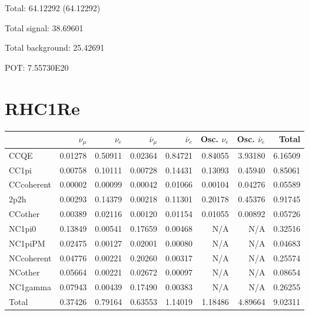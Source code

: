 \documentclass[10pt,a4paper]{article}
\begin{document}
Total: 64.12292    (64.12292)


Total signal: 38.69601


Total background: 25.42691

POT: 7.55730E20


\section*{RHC1Re}
\begin{tabular} { | l ||r | r | r | r | r | r | | r | }
\hline
              & $\nu_\mu$            & $\nu_e$              & $\bar{\nu}_{\mu}$    & $\bar{\nu}_{e}$      & Osc. $\nu_e$         & Osc. $\bar{\nu}_{e}$ & Total                \\ \hline\hline
 CCQE         & 0.01278              & 0.50911              & 0.02364              & 0.84721              & 0.84055              & 3.93180              & 6.16509              \\ \hline
 CC1pi        & 0.00758              & 0.10111              & 0.00728              & 0.14431              & 0.13093              & 0.45940              & 0.85061              \\ \hline
 CCcoherent   & 0.00002              & 0.00099              & 0.00042              & 0.01066              & 0.00104              & 0.04276              & 0.05589              \\ \hline
 2p2h         & 0.00293              & 0.14379              & 0.00218              & 0.11301              & 0.20178              & 0.45376              & 0.91745              \\ \hline
 CCother      & 0.00389              & 0.02116              & 0.00120              & 0.01154              & 0.01055              & 0.00892              & 0.05726              \\ \hline
 NC1pi0       & 0.13849              & 0.00541              & 0.17659              & 0.00468              & N/A                  & N/A                  & 0.32516              \\ \hline
 NC1piPM      & 0.02475              & 0.00127              & 0.02001              & 0.00080              & N/A                  & N/A                  & 0.04683              \\ \hline
 NCcoherent   & 0.04776              & 0.00221              & 0.20260              & 0.00317              & N/A                  & N/A                  & 0.25574              \\ \hline
 NCother      & 0.05664              & 0.00221              & 0.02672              & 0.00097              & N/A                  & N/A                  & 0.08654              \\ \hline
 NC1gamma     & 0.07943              & 0.00439              & 0.17490              & 0.00383              & N/A                  & N/A                  & 0.26255              \\ \hline
\hline
 Total        & 0.37426              & 0.79164              & 0.63553              & 1.14019              & 1.18486              & 4.89664              & 9.02311              \\ \hline

\end{tabular}
\end{document}
